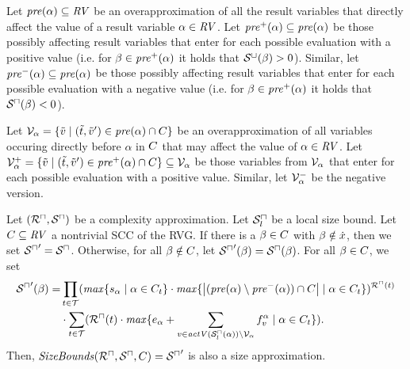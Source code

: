 \begin{definition}
  Let $\mathit{pre}(\alpha) \subseteq \mathit{RV}$ be an overapproximation of all the result variables that directly affect the value of a result variable $\alpha \in \mathit{RV}$.
  Let $\mathit{pre}^+(\alpha) \subseteq \mathit{pre}(\alpha)$ be those possibly affecting result variables that enter for each possible evaluation with a positive value
  (i.e. for $\beta \in \mathit{pre}^+(\alpha)$ it holds that ${\mathcal{S}^\sqcup}(\beta) > 0$).
  Similar, let $\mathit{pre}^-(\alpha) \subseteq \mathit{pre}(\alpha)$ be those possibly affecting result variables that enter for each possible evaluation with a negative value
  (i.e. for $\beta \in \mathit{pre}^+(\alpha)$ it holds that ${\mathcal{S}^\sqcap}(\beta) < 0$).
\end{definition}

\begin{definition}
  Let $\mathcal{V}_\alpha = \lbrace  \tilde{v} \mid (\tilde{t}, \tilde{v}') \in \mathit{pre}(\alpha) \cap C  \rbrace$ be an overapproximation of all variables occuring directly before $\alpha$ in $C$ that may affect the value of $\alpha \in \mathit{RV}$.
  Let $\mathcal{V}^+_\alpha = \lbrace  \tilde{v} \mid (\tilde{t}, \tilde{v}') \in \mathit{pre}^+(\alpha) \cap C  \rbrace \subseteq \mathcal{V}_\alpha$ be those variables from $\mathcal{V}_\alpha$ that enter for each possible evaluation with a positive value.
  Similar, let $\mathcal{V}^-_\alpha$ be the negative version.
\end{definition}

\begin{theorem}
  Let $({\mathcal{R}^\sqcap}, {\mathcal{S}^\sqcap})$ be a complexity approximation.
  Let ${\mathcal{S}^\sqcap_l}$ be a local size bound.
  Let $C \subseteq \mathit{RV}$ a nontrivial SCC of the RVG.
  If there is a $\beta \in C$ with $\beta \notin \dot{x}$, then we set ${\mathcal{S}^\sqcap}' = {\mathcal{S}^\sqcap}$.
  Otherwise, for all $\beta \notin C$, let ${\mathcal{S}^\sqcap}'(\beta) = {\mathcal{S}^\sqcap}(\beta)$.
  For all $\beta \in C$, we set
  \begin{align*}
    {\mathcal{S}^\sqcap}'(\beta) = & \prod_{t \in \mathcal{T}} (\mathit{max} \lbrace s_{\alpha} \mid \alpha \in C_t \rbrace
                       \cdot \mathit{max} \lbrace \left|(\mathit{pre}(\alpha) \setminus \mathit{pre}^-(\alpha)) \cap C\right| \mid \alpha \in C_t \rbrace)^{{\mathcal{R}^\sqcap}(t)} \\
                     & \cdot \sum_{t \in \mathcal{T}} ({\mathcal{R}^\sqcap}(t) \cdot \mathit{max} \lbrace  e_\alpha + \sum_{v \in \mathit{actV}({\mathcal{S}^\sqcap_l}(\alpha)) \setminus \mathcal{V}_\alpha} f^\alpha_v \mid \alpha \in C_t  \rbrace).
  \end{align*}
  Then, $\mathit{SizeBounds}({\mathcal{R}^\sqcap}, {\mathcal{S}^\sqcap}, C) = {\mathcal{S}^\sqcap}'$ is also a size approximation. 
\end{theorem}

